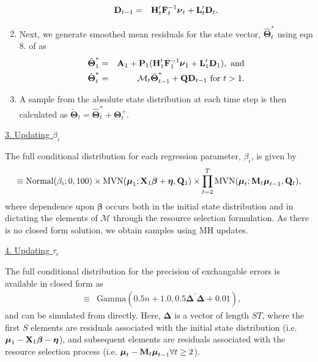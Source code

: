 \documentclass[12pt,fleqn]{article}
\begin{document}
\begin{flushleft}
\begin{enumerate}
\begin{eqnarray*}
        {\bf D}_{t-1} & = & {\bf H}_t^\prime {\bf F}_t^{-1} \boldsymbol{\nu}_t + {\bf L}_t^\prime {\bf D}_t.
      \end{eqnarray*}
  \item Next, we generate smoothed mean residuals for the state vector, $\hat{\boldsymbol{\Theta}}_t^*$ using eqn 8. of \citet{DurbinKoopman2002} as
      \begin{eqnarray*}
        \hat{\boldsymbol{\Theta}}_1^* & = &  {\bf A}_1 + {\bf P}_1 ( {\bf H}_1^\prime {\bf F}_1^{-1} \boldsymbol{\nu}_1+{\bf L}_1^\prime {\bf D}_1), \text{ and} \\
        \hat{\boldsymbol{\Theta}}_{t}^* & = & \mathcal{M}_{t} \hat{\boldsymbol{\Theta}}_{t-1}^* + {\bf Q} {\bf D}_{t-1}  \text{ for } t>1.
      \end{eqnarray*}
  \item A sample from the absolute state distribution at each time step is then calculated as $\tilde{\boldsymbol{\Theta}}_t = \hat{\boldsymbol{\Theta}}_{t}^* + \boldsymbol{\Theta}_t^+$.
\end{enumerate}


\underline{3. Updating $\beta_i$}

\hspace{.5in}The full conditional distribution for each regression parameter, $\beta_i$, is given by
\begin{eqnarray*}
  [\beta_i | \cdot] \equiv \textrm{Normal}(\beta_i;0,100) \times \textrm{MVN}(\boldsymbol{\mu}_1; {\bf X}_1 \boldsymbol{\beta} + \boldsymbol{\eta},{\bf Q}_1) \times \prod_{t=2}^T \textrm{MVN}(\boldsymbol{\mu}_t; {\bf M}_t \boldsymbol{\mu}_{t-1},{\bf Q}_t),
\end{eqnarray*}
where dependence upon $\boldsymbol{\beta}$ occurs both in the initial state distribution and in dictating the elements of $\mathcal{M}$ through the resource selection formulation.  As there is no closed form solution, we
obtain samples using MH updates.

\underline{4. Updating $\tau_\epsilon$}

The full conditional distribution for the precision of exchangable errors is available in closed form as
\begin{eqnarray*}
  [\tau_\epsilon | \cdot] & \equiv & \textrm{Gamma}(0.5n + 1.0,0.5 \boldsymbol{\Delta}^\prime \boldsymbol{\Delta} + 0.01),
\end{eqnarray*}
and can be simulated from directly.
 Here, $\boldsymbol{\Delta}$ is a vector of length $ST$, where the first $S$ elements are residuals associated with the initial state distribution (i.e. $\boldsymbol{\mu}_1 - {\bf X}_1 \boldsymbol{\beta} -  \boldsymbol{\eta}$), and subsequent elements are residuals associated with the resource selection process (i.e. $\boldsymbol{\mu}_t - {\bf M}_t \boldsymbol{\mu}_{t-1} \forall t \ge 2$).


\end{flushleft}
\end{document}
